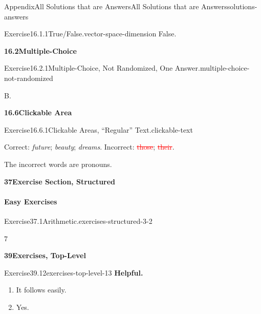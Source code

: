 \documentclass[twoside,10pt,]{article}
\newcommand{\blocktitlefont}{\relax}
\newcommand{\deletethick}{.25ex}
\newcommand{\deleted}[1]{\renewcommand{\ULthickness}{\deletethick}\textcolor{red}{\sout{#1}}}
\numberwithin{equation}{section}
\begin{document}
\begin{solutions-section}{Appendix}{All Solutions that are Answers}{}{All Solutions that are Answers}{}{}{solutions-answers}
\begin{divisionsolution}{Exercise}{16.1.1}{True\slash{}False.}{vector-space-dimension}
\noindent\hypertarget{vector-space-dimension-5-back}{}False.%
\end{divisionsolution}%
\par\medskip
\noindent\textbf{\large{}16.2\space\textperiodcentered\space{}Multiple-Choice}
\begin{divisionsolution}{Exercise}{16.2.1}{Multiple-Choice, Not Randomized, One Answer.}{multiple-choice-not-randomized}%
\par\smallskip%
\noindent\hypertarget{multiple-choice-not-randomized-6-back}{}B.%
\end{divisionsolution}%
\par\medskip
\noindent\textbf{\large{}16.6\space\textperiodcentered\space{}Clickable Area}
\begin{divisionsolution}{Exercise}{16.6.1}{Clickable Areas, ``Regular'' Text.}{clickable-text}%
\par\smallskip%
\noindent\hypertarget{clickable-text-3-back}{}Correct: \emph{future}; \emph{beauty}; \emph{dreams}. Incorrect: \deleted{those}; \deleted{their}.%
\par
The incorrect words are pronouns.%
\end{divisionsolution}%
\par\medskip
\noindent\textbf{\large{}37\space\textperiodcentered\space{}Exercise Section, Structured}
\paragraph[{Easy Exercises}]{Easy Exercises}
\begin{divisionsolution}{Exercise}{37.1}{Arithmetic.}{exercises-structured-3-2}%
\par\smallskip%
\noindent\hypertarget{exercises-structured-3-2-3-back}{}\(7\)%
\end{divisionsolution}%
\par\medskip\noindent
\par\medskip
\noindent\textbf{\large{}39\space\textperiodcentered\space{}Exercises, Top-Level}
\begin{divisionsolution}{Exercise}{39.12}{}{exercises-top-level-13}%
\noindent\textbf{\blocktitlefont  Helpful.}\hypertarget{exercise-complicated-first-answer-back}{}\quad{}%
\begin{enumerate}[label={(\alph*)}]
\item{}It follows easily.%
\item{}Yes.%
\end{enumerate}
%
\end{divisionsolution}%
\end{solutions-section}
\end{document}
